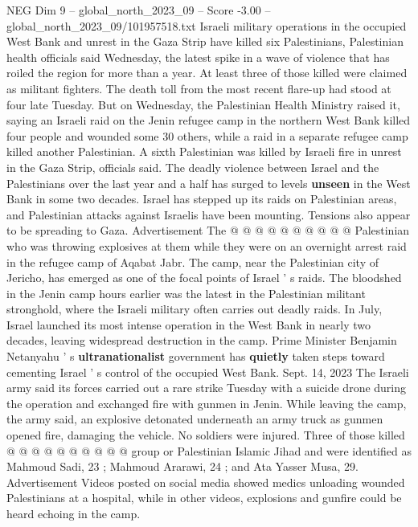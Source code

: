 \begin{textsample}{NEG Dim 9 – global\_north\_2023\_09 – Score -3.00 – global\_north\_2023\_09/101957518.txt}  \label{ex:f9_neg_037}
Israeli military operations in the occupied West Bank and unrest in the Gaza Strip have killed six Palestinians, Palestinian health officials said Wednesday, the latest spike in a wave of violence that has roiled the region for more than a year.
At least three of those killed were claimed as militant fighters.
The death toll from the most recent flare-up had stood at four late Tuesday.
But on Wednesday, the Palestinian Health Ministry raised it, saying an Israeli raid on the Jenin refugee camp in the northern West Bank killed four people and wounded some 30 others, while a raid in a separate refugee camp killed another Palestinian.
A sixth Palestinian was killed by Israeli fire in unrest in the Gaza Strip, officials said.
The deadly violence between Israel and the Palestinians over the last year and a half has surged to levels \textbf{unseen} in the West Bank in some two decades.
Israel has stepped up its raids on Palestinian areas, and Palestinian attacks against Israelis have been mounting.
Tensions also appear to be spreading to Gaza.
Advertisement The @ @ @ @ @ @ @ @ @ @ Palestinian who was throwing explosives at them while they were on an overnight arrest raid in the refugee camp of Aqabat Jabr.
The camp, near the Palestinian city of Jericho, has emerged as one of the focal points of Israel ' s raids.
The bloodshed in the Jenin camp hours earlier was the latest in the Palestinian militant stronghold, where the Israeli military often carries out deadly raids.
In July, Israel launched its most intense operation in the West Bank in nearly two decades, leaving widespread destruction in the camp.
Prime Minister Benjamin Netanyahu ' s \textbf{ultranationalist} government has \textbf{quietly} taken steps toward cementing Israel ' s control of the occupied West Bank.
Sept. 14, 2023 The Israeli army said its forces carried out a rare strike Tuesday with a suicide drone during the operation and exchanged fire with gunmen in Jenin.
While leaving the camp, the army said, an explosive detonated underneath an army truck as gunmen opened fire, damaging the vehicle.
No soldiers were injured.
Three of those killed @ @ @ @ @ @ @ @ @ @ group or Palestinian Islamic Jihad and were identified as Mahmoud Sadi, 23 ; Mahmoud Ararawi, 24 ; and Ata Yasser Musa, 29.
Advertisement Videos posted on social media showed medics unloading wounded Palestinians at a hospital, while in other videos, explosions and gunfire could be heard echoing in the camp.

\end{textsample}
